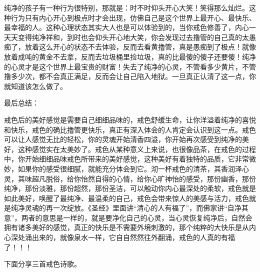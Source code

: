 纯净的孩子有一种行为很特别，那就是：时不时仰头开心大笑！笑得那么灿烂。这种行为只有内心开心到极点时才会出现，仿佛自己是这个世界上最开心、最快乐、最幸福的人。这种心理状态其实大人也是可以体验到的，当你戒色修善了，内心一天天变得纯净祥和，到时也会仰头开心地大笑，你会发现过去撸管的自己真的太愚痴了，放着这么开心的状态不去体验，反而去看黄撸管，真是愚痴到了极点！就像放着成吨的黄金不去拿，反而去垃圾桶里捡垃圾，真的比最傻的傻子还要傻！纯净的心灵才是这个世界上最宝贵的财富！失去了纯净的心灵，不管看多少黄片，不管撸多少次，都不会真正满足，反而会让自己陷入地狱。一旦真正认清了这一点，你就知道该怎么做了。

最后总结：

戒色后的美好感觉是需要自己细细品味的，戒色舒缓生命，让你洋溢着纯净的喜悦和快乐，戒色的确比撸管更快乐，真正有深入体会的人肯定会认识到这一点。戒色可以让人感觉无比的轻松，你的灵魂开始清香四溢，你开始再次感受到纯净的美好，这种感觉实在太美妙了。戒色从某种意义上来说，也很像品茶，在戒色的过程中，你开始细细品味戒色所带来的美好感觉，这种美好有着独特的品质，它非常微妙，如果你的感受很细腻，就能充分体会到它。沏一杯戒色的清茶，其香润泽心灵，其味超凡脱俗，给你怡然自得的心情，给你心旷神怡的感受，那份幽香，那份纯净，那份淡雅，那份超然，那份圣洁，可以触动你内心最深处的柔软，戒色就是如此美好，唤醒了最纯净、最温柔的自己，戒色会带来惊人的美感与活力，戒色就是纯净灵魂的再一次绽放。《圣经》里面讲“清心的人有福了”，而佛家讲“自净其意”，两者的意思是一样的，就是要净化自己的心灵，当心灵恢复纯净后，自然会拥有诸多美好的感觉，真正的快乐是不需要外境刺激的，那个纯粹的大快乐是从内心深处涌出来的，就像泉水一样，它自自然然往外翻涌，戒色的人真的有福了！！！

下面分享三首戒色诗歌。

